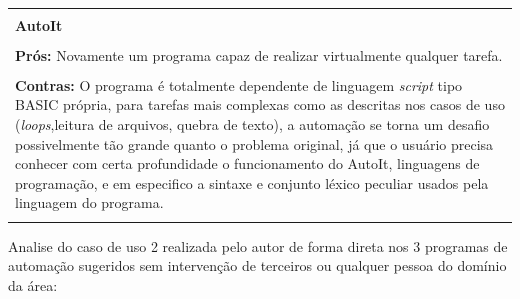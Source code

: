 \documentclass[tg]{mdtufsm}
\begin{document}
{\begin{tabular}{ | m{15.6cm} | }
		\hline \end{tabular}} \\
	{\centering \begin{tabular}{ | m{15.6cm} | }
		 \hline \\
	
		{\bf AutoIt} \\ \\
		{\bf Prós:} Novamente um programa capaz de realizar virtualmente qualquer tarefa. \\ \\
		{\bf Contras:}  O programa é totalmente dependente de linguagem \emph{script} tipo BASIC própria, para tarefas mais complexas como as descritas nos casos de uso (\emph{loops},leitura de arquivos, quebra de texto), a automação se torna um desafio possivelmente tão grande quanto o problema original, já que o usuário precisa conhecer com certa profundidade o funcionamento do AutoIt, linguagens de programação, e em especifico a sintaxe e conjunto léxico peculiar usados pela linguagem do programa. \\ \\
		
		\hline
	\end{tabular}}
	
	\bigskip
	Analise do caso de uso 2 realizada pelo autor de forma direta nos 3 programas de automação sugeridos sem intervenção de terceiros ou qualquer pessoa do domínio da área:
	\bigskip
	
\end{document}
